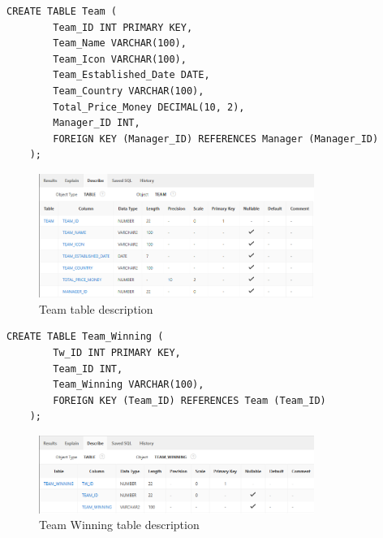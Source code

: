 \begin{lstlisting}[caption={Create Team table}, label={lst:create_team}]
    CREATE TABLE Team (
        Team_ID INT PRIMARY KEY,
        Team_Name VARCHAR(100),
        Team_Icon VARCHAR(100),
        Team_Established_Date DATE,
        Team_Country VARCHAR(100),
        Total_Price_Money DECIMAL(10, 2),
        Manager_ID INT,
        FOREIGN KEY (Manager_ID) REFERENCES Manager (Manager_ID)
    );
    \end{lstlisting}
\begin{figure}[H]
    \centering
    \includegraphics[width=0.8\textwidth]{images/TableDesc/TEAM.png}
    \caption{Team table description}
    \label{fig:team_table}
\end{figure}

\begin{lstlisting}[caption={Create Team Winning table}, label={lst:create_team_winning}]
    CREATE TABLE Team_Winning (
        Tw_ID INT PRIMARY KEY,
        Team_ID INT,
        Team_Winning VARCHAR(100),
        FOREIGN KEY (Team_ID) REFERENCES Team (Team_ID)
    );
    \end{lstlisting}

\begin{figure}[h]
    \centering
    \includegraphics[width=0.8\textwidth]{images/TableDesc/TEAM_WINNING.png}
    \caption{Team Winning table description}
    \label{fig:team_winning_table}
\end{figure}

